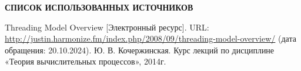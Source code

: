 \renewcommand{\bibname}{}
\begin{thebibliography}{6}
\renewcommand{\bibname}{СПИСОК ИСПОЛЬЗОВАННЫХ ИСТОЧНИКОВ}
\begin{center}
    \textbf{\bibname}
\end{center}
     Threading Model Overview [Электронный ресурс]. URL: \url{http://justin.harmonize.fm/index.php/2008/09/threading-model-overview/} (дата обращения: 20.10.2024).
	Ю. В. Кочержинская. Курс лекций по дисциплине «Теория вычислительных
    процессов», 2014г.
\end{thebibliography}